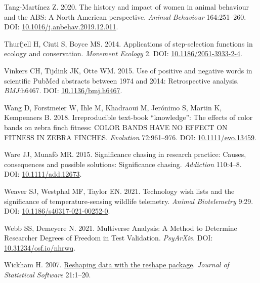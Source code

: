 \documentclass[10pt,a4paper]{article}
\newlength{\cslhangindent}
\newlength{\cslentryspacingunit} %
\newenvironment{CSLReferences}[2] %
 {%
  \setlength{\parindent}{0pt}
  \ifodd #1
  \let\oldpar\par
  \def\par{\hangindent=\cslhangindent\oldpar}
  \fi
  \setlength{\parskip}{#2\cslentryspacingunit}
 }%
 {}
\begin{document}
\begin{CSLReferences}{1}{0}
\leavevmode{}%
Tang-Martínez Z. 2020. The history and impact of women in animal behaviour and the {ABS}: A {North} {American} perspective. \emph{Animal Behaviour} 164:251--260. DOI: \href{https://doi.org/10.1016/j.anbehav.2019.12.011}{10.1016/j.anbehav.2019.12.011}.

\leavevmode{}%
Thurfjell H, Ciuti S, Boyce MS. 2014. Applications of step-selection functions in ecology and conservation. \emph{Movement Ecology} 2. DOI: \href{https://doi.org/10.1186/2051-3933-2-4}{10.1186/2051-3933-2-4}.

\leavevmode{}%
Vinkers CH, Tijdink JK, Otte WM. 2015. Use of positive and negative words in scientific {PubMed} abstracts between 1974 and 2014: Retrospective analysis. \emph{BMJ}:h6467. DOI: \href{https://doi.org/10.1136/bmj.h6467}{10.1136/bmj.h6467}.

\leavevmode{}%
Wang D, Forstmeier W, Ihle M, Khadraoui M, Jerónimo S, Martin K, Kempenaers B. 2018. Irreproducible text-book {``knowledge''}: {The} effects of color bands on zebra finch fitness: {COLOR} {BANDS} {HAVE} {NO} {EFFECT} {ON} {FITNESS} {IN} {ZEBRA} {FINCHES}. \emph{Evolution} 72:961--976. DOI: \href{https://doi.org/10.1111/evo.13459}{10.1111/evo.13459}.

\leavevmode{}%
Ware JJ, Munafò MR. 2015. Significance chasing in research practice: Causes, consequences and possible solutions: {Significance} chasing. \emph{Addiction} 110:4--8. DOI: \href{https://doi.org/10.1111/add.12673}{10.1111/add.12673}.

\leavevmode{}%
Weaver SJ, Westphal MF, Taylor EN. 2021. Technology wish lists and the significance of temperature-sensing wildlife telemetry. \emph{Animal Biotelemetry} 9:29. DOI: \href{https://doi.org/10.1186/s40317-021-00252-0}{10.1186/s40317-021-00252-0}.

\leavevmode{}%
Webb SS, Demeyere N. 2021. Multiverse {Analysis}: {A} {Method} to {Determine} {Researcher} {Degrees} of {Freedom} in {Test} {Validation}. \emph{PsyArXiv}. DOI: \href{https://doi.org/10.31234/osf.io/nhrwq}{10.31234/osf.io/nhrwq}.

\leavevmode{}%
Wickham H. 2007. \href{http://www.jstatsoft.org/v21/i12/}{Reshaping data with the {reshape} package}. \emph{Journal of Statistical Software} 21:1--20.


\end{CSLReferences}
\end{document}
